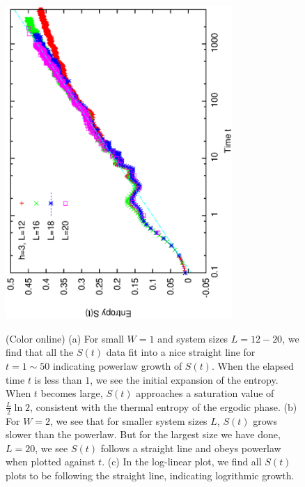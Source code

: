 \documentclass[prl,aps,epsf,showpacs,twocolumn]{revtex4}
\begin{document}
\begin{figure}[b]
  \hspace{0.0in}
  \vspace{-0.24in}
  \includegraphics[angle=-90,width=3.4in]{newfig1e.ps}\\
  \vspace{0.1in}
  \caption{(Color online) (a) For small $W=1$ and system sizes $L=12-20$, we find
    that all the $S(t)$ data fit into a nice straight line for $t=1\sim 50$ indicating
    powerlaw growth of $S(t)$. When the elapsed time $t$ is less than $1$, we see the
    initial expansion of the entropy. When $t$ becomes large, $S(t)$ approaches a
    saturation value of $\frac L 2 \ln2$, consistent with the thermal entropy of the
    ergodic phase.
    (b) For $W=2$, we see that for smaller system sizes $L$, $S(t)$ grows slower
    than the powerlaw. But for the largest size we have done, $L=20$, we see $S(t)$
    follows a straight line and obeys powerlaw when plotted against $t$.
    (c) In the log-linear plot, we find all $S(t)$ plots to be following the straight
    line, indicating logrithmic growth.
  }
\label{fig1}
\end{figure}
\end{document}
